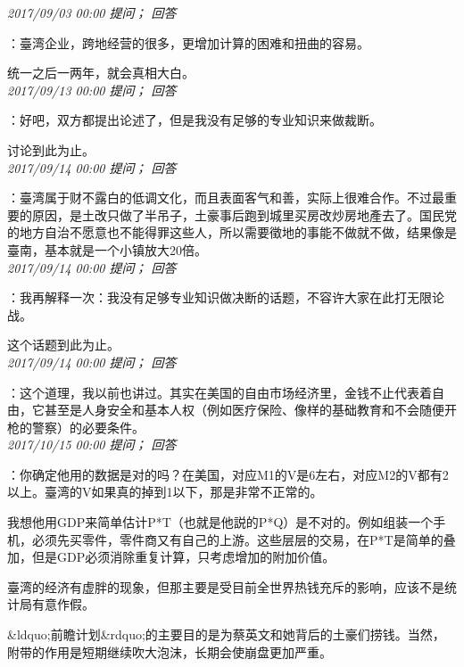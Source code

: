 \documentclass[twocolumn]{ctexart}
\begin{document}
\textit{\hfill\noindent\small 2017/09/03 00:00 提问； 回答}

：臺湾企业，跨地经营的很多，更增加计算的困难和扭曲的容易。

统一之后一两年，就会真相大白。\\

\textit{\hfill\noindent\small 2017/09/13 00:00 提问； 回答}

：好吧，双方都提出论述了，但是我没有足够的专业知识来做裁断。

讨论到此为止。\\

\textit{\hfill\noindent\small 2017/09/14 00:00 提问； 回答}

：臺湾属于财不露白的低调文化，而且表面客气和善，实际上很难合作。不过最重要的原因，是土改只做了半吊子，土豪事后跑到城里买房改炒房地產去了。国民党的地方自治不愿意也不能得罪这些人，所以需要徵地的事能不做就不做，结果像是臺南，基本就是一个小镇放大20倍。\\

\textit{\hfill\noindent\small 2017/09/14 00:00 提问； 回答}

：我再解释一次：我没有足够专业知识做决断的话题，不容许大家在此打无限论战。

这个话题到此为止。\\

\textit{\hfill\noindent\small 2017/09/14 00:00 提问； 回答}

：这个道理，我以前也讲过。其实在美国的自由市场经济里，金钱不止代表着自由，它甚至是人身安全和基本人权（例如医疗保险、像样的基础教育和不会随便开枪的警察）的必要条件。\\

\textit{\hfill\noindent\small 2017/10/15 00:00 提问； 回答}

：你确定他用的数据是对的吗？在美国，对应M1的V是6左右，对应M2的V都有2以上。臺湾的V如果真的掉到1以下，那是非常不正常的。

我想他用GDP来简单估计P*T（也就是他説的P*Q）是不对的。例如组装一个手机，必须先买零件，零件商又有自己的上游。这些层层的交易，在P*T是简单的叠加，但是GDP必须消除重复计算，只考虑增加的附加价值。

臺湾的经济有虚胖的现象，但那主要是受目前全世界热钱充斥的影响，应该不是统计局有意作假。

\&ldquo;前瞻计划\&rdquo;的主要目的是为蔡英文和她背后的土豪们捞钱。当然，附带的作用是短期继续吹大泡沫，长期会使崩盘更加严重。
\end{document}
